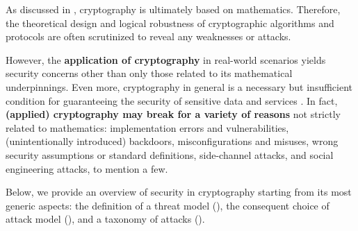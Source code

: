 As discussed in , cryptography is ultimately based on mathematics. Therefore, the theoretical design and logical robustness of cryptographic algorithms and protocols are often scrutinized to reveal any weaknesses or attacks.

However, the \textbf{application of cryptography} in real-world scenarios yields security concerns other than only those related to its mathematical underpinnings. Even more, cryptography in general is a necessary but insufficient condition for guaranteeing the security of sensitive data and services \cite{menezes_challenges_2021}. In fact, \textbf{(applied) cryptography may break for a variety of reasons} not strictly related to mathematics: implementation errors and vulnerabilities, (unintentionally introduced) backdoors, misconfigurations and misuses, wrong security assumptions or standard definitions, side-channel attacks, and social engineering attacks, to mention a few.

Below, we provide an overview of security in cryptography starting from its most generic aspects: the definition of a threat model (), the consequent choice of attack model (), and a taxonomy of attacks ().